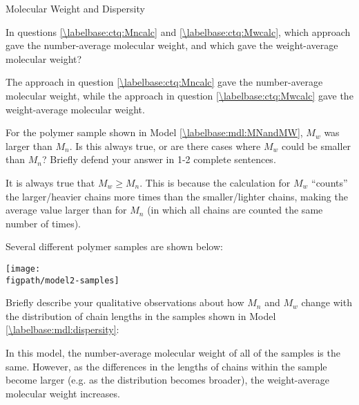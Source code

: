 \begin{activity}{Molecular Weight and Dispersity}
\begin{ctqs}
	\question In questions \ref{\labelbase:ctq:Mncalc} and \ref{\labelbase:ctq:Mwcalc}, which approach gave the number-average molecular weight, and which gave the weight-average molecular weight?
	
		\begin{solution}[1.5in]{}
			The approach in question \ref{\labelbase:ctq:Mncalc} gave the number-average molecular weight, while the approach in question \ref{\labelbase:ctq:Mwcalc} gave the weight-average molecular weight.
		\end{solution}
	
	\question For the polymer sample shown in Model \ref{\labelbase:mdl:MNandMW}, $M_w$ was larger than $M_n$.  Is this always true, or are there cases where $M_w$ could be smaller than $M_n$?  Briefly defend your answer in 1-2 complete sentences.
	
		\label{\labelbase:ctq:MWvsMN}
		
		\begin{solution}[2in]{}
		
			It is always true that $M_w \geq M_n$.  This is because the calculation for $M_w$ ``counts'' the larger/heavier chains more times than the smaller/lighter chains, making the average value larger than for $M_n$ (in which all chains are counted the same number of times).
			
		\end{solution}
	
		
\end{ctqs}

\begin{model}
\label{\labelbase:mdl:dispersity}

	Several different polymer samples are shown below:
	
	\vspace{6pt}
	\centerline{\texttt{[image: \\figpath/model2-samples]}}

\end{model}
	
\begin{ctqs}

	\question Briefly describe your qualitative observations about how $M_n$ and $M_w$ change with the distribution of chain lengths in the samples shown in Model \ref{\labelbase:mdl:dispersity}:
	
		\begin{solution}[2in]{}
			In this model, the number-average molecular weight of all of the samples is the same.  However, as the differences in the lengths of chains within the sample become larger (e.g. as the distribution becomes broader), the weight-average molecular weight increases.
		\end{solution}
	

\end{ctqs}
\end{activity}
